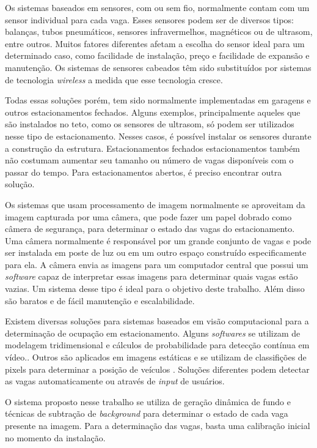     Os sistemas baseados em sensores, com ou sem fio, normalmente contam com um sensor individual para cada vaga. Esses sensores podem ser de diversos tipos: balanças, tubos pneumáticos, sensores infravermelhos, magnéticos ou de ultrasom, entre outros. Muitos fatores diferentes afetam a escolha do sensor ideal para um determinado caso, como facilidade de instalação, preço e facilidade de expansão e manutenção. Os sistemas de sensores cabeados têm sido substituídos por sistemas de tecnologia \textit{wireless} a medida que esse tecnologia cresce.

    Todas essas soluções porém, tem sido normalmente implementadas em garagens e outros estacionamentos fechados. Alguns exemplos, principalmente aqueles que são instalados no teto, como os sensores de ultrasom, só podem ser utilizados nesse tipo de estacionamento. Nesses casos, é possível instalar os sensores durante a construção da estrutura. Estacionamentos fechados estacionamentos também não costumam aumentar seu tamanho ou número de vagas disponíveis com o passar do tempo. Para estacionamentos abertos, é preciso encontrar outra solução.

    Os sistemas que usam processamento de imagem normalmente se aproveitam da imagem capturada por uma câmera, que pode fazer um papel dobrado como câmera de segurança, para determinar o estado das vagas do estacionamento. Uma câmera normalmente é responsável por um grande conjunto de vagas e pode ser instalada em poste de luz ou em um outro espaço construído especificamente para ela. A câmera envia as imagens para um computador central que possui um \textit{software} capaz de interpretar essas imagens para determinar quais vagas estão vazias. Um sistema desse tipo é ideal para o objetivo deste trabalho. Além disso são baratos e de fácil manutenção e escalabilidade.

    Existem diversas soluções para sistemas baseados em visão computacional para a determinação de ocupação em estacionamento. Alguns \textit{softwares} se utilizam de modelagem tridimensional e cálculos de probabilidade para detecção contínua em vídeo.\cite{delibaltov2013parking}. Outros são aplicados em imagens estáticas e se utilizam de classifições de pixels para determinar a posição de veículos \cite{true2007vacant}. Soluções diferentes podem detectar as vagas automaticamente ou através de \textit{input} de usuários.

    O sistema proposto nesse trabalho se utiliza de geração dinâmica de fundo e técnicas de subtração de \textit{background} para determinar o estado de cada vaga presente na imagem. Para a determinação das vagas, basta uma calibração inicial no momento da instalação.





